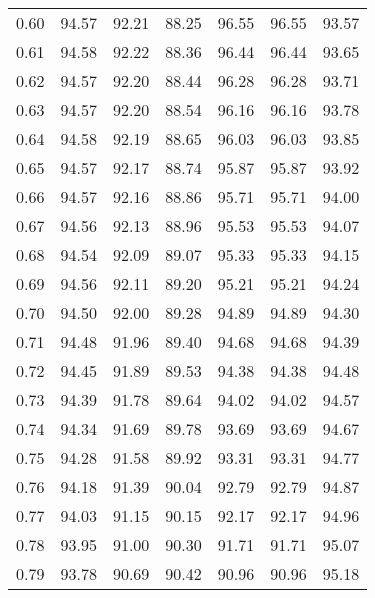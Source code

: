 \begin{tabular}{|c|c|c|c|c|c|c|}
      0.60 &     94.57 &     92.21 &      88.25 &   96.55 &      96.55 &         93.57 \\
      0.61 &     94.58 &     92.22 &      88.36 &   96.44 &      96.44 &         93.65 \\
      0.62 &     94.57 &     92.20 &      88.44 &   96.28 &      96.28 &         93.71 \\
      0.63 &     94.57 &     92.20 &      88.54 &   96.16 &      96.16 &         93.78 \\
      0.64 &     94.58 &     92.19 &      88.65 &   96.03 &      96.03 &         93.85 \\
      0.65 &     94.57 &     92.17 &      88.74 &   95.87 &      95.87 &         93.92 \\
      0.66 &     94.57 &     92.16 &      88.86 &   95.71 &      95.71 &         94.00 \\
      0.67 &     94.56 &     92.13 &      88.96 &   95.53 &      95.53 &         94.07 \\
      0.68 &     94.54 &     92.09 &      89.07 &   95.33 &      95.33 &         94.15 \\
      0.69 &     94.56 &     92.11 &      89.20 &   95.21 &      95.21 &         94.24 \\
      0.70 &     94.50 &     92.00 &      89.28 &   94.89 &      94.89 &         94.30 \\
      0.71 &     94.48 &     91.96 &      89.40 &   94.68 &      94.68 &         94.39 \\
      0.72 &     94.45 &     91.89 &      89.53 &   94.38 &      94.38 &         94.48 \\
      0.73 &     94.39 &     91.78 &      89.64 &   94.02 &      94.02 &         94.57 \\
      0.74 &     94.34 &     91.69 &      89.78 &   93.69 &      93.69 &         94.67 \\
      0.75 &     94.28 &     91.58 &      89.92 &   93.31 &      93.31 &         94.77 \\
      0.76 &     94.18 &     91.39 &      90.04 &   92.79 &      92.79 &         94.87 \\
      0.77 &     94.03 &     91.15 &      90.15 &   92.17 &      92.17 &         94.96 \\
      0.78 &     93.95 &     91.00 &      90.30 &   91.71 &      91.71 &         95.07 \\
      0.79 &     93.78 &     90.69 &      90.42 &   90.96 &      90.96 &         95.18 \\

\end{tabular}
